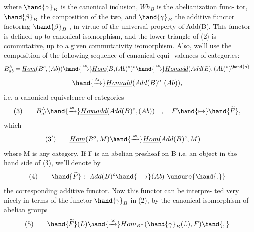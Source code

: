 where $\hand{\alpha}_B$ is the canonical inclusion, $Wh_B$ is the abelianization func-%
tor, $\hand{\beta}_B$ the composition of the two, and $\hand{\gamma}_B$ the \uline{additive} functor
factoring $\hand{\beta}_B$ , in virtue of the universal property of Add(B). This
functor is defined up to canonical isomorphism, and the lower triangle
of (2) is commutative, up to a given commutativity isomorphism. Also,
we'll use the composition of the following sequence of canonical equi-%
valences of categories:
\[ B^{\wedge}_{ab} = \underline{Hom}(B^{o},(Ab)) \hand{\xrightarrow{\approx}} \underline{Hom}(B,(Ab)^{o})^{o} \hand{\xrightarrow{\approx}} \underline{Homadd}(Add(B),(Ab)^{o})^{\hand{o}} \]
\[ \hand{\xrightarrow{\approx}} \underline{Homadd}(Add(B)^{o},(Ab)) , \]
i.e. a canonical equivalence of categories
\[ (3) \qquad B^{\wedge}_{ab} \hand{\xrightarrow{\approx}} \underline{Homadd}(Add(B)^{o}, (Ab)) \quad , \quad F \hand{\mapsto} \hand{\widetilde{F}} , \]
which   
\[ (3') \qquad \underline{Hom}(B^{o}, M) \hand{\xrightarrow{\approx}} \underline{Hom}(Add(B)^{o}, M ) \quad , \]
where M is any   category. If F is an abelian presheaf on B
i.e. an object in the   hand side of (3), we'll denote by
\[ (4) \qquad \hand{\widetilde{F}} : \ Add(B)^{o} \hand{\longrightarrow} (Ab) \ \unsure{\hand{.}} \]
the corresponding additive functor. Now this functor can be interpre-%
ted very nicely in terms of the functor $\hand{\gamma}_B$ in (2), by the canonical
isomorphism of abelian groups
\[ (5) \qquad \hand{\widetilde{F}}(L) \hand{\xrightarrow{\approx}} Hom_{B^{\wedge}}(\hand{\gamma}_B(L),F)\hand{,} \]

